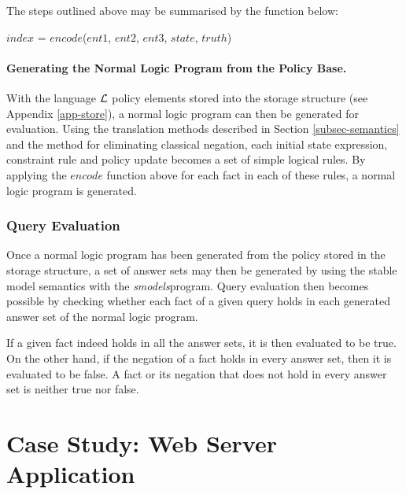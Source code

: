\documentclass[global,twocolumn,draft]{svjour}
\newenvironment{vquote}
  {\begin{list}{}{\leftmargin 1em}\item[]}
  {\end{list}}
\begin{document}
          The steps outlined above may be summarised by the function below:

          \begin{vquote}
            $index$ = $encode$($ent1$, $ent2$, $ent3$, $state$, $truth$)
          \end{vquote}

        \paragraph{Generating the Normal Logic Program from the Policy Base.}

          With the language ${\cal L}$ policy elements stored into the storage
          structure (see Appendix \ref{app-store}), a normal logic program can
          then be generated for evaluation. Using the translation methods
          described in Section \ref{subsec-semantics} and the method for
          eliminating classical negation, each initial state expression,
          constraint rule and policy update becomes a set of simple logical
          rules. By applying the $encode$ function above for each fact in each
          of these rules, a normal logic program is generated.

      \subsubsection{Query Evaluation}

        Once a normal logic program has been generated from the policy stored
        in the storage structure, a set of answer sets may then be generated
        by using the stable model semantics \cite{SIM} with the
        {\em smodels}\footnotemark program. Query evaluation then becomes
        possible by checking whether each fact of a given query holds in each
        generated answer set of the normal logic program.


        If a given fact indeed holds in all the answer sets, it is then
        evaluated to be true. On the other hand, if the negation of a fact
        holds in every answer set, then it is evaluated to be false. A fact
        or its negation that does not hold in every answer set is neither true
        nor false.

  \section{Case Study: Web Server Application}
    \label{sec-case}
\end{document}
